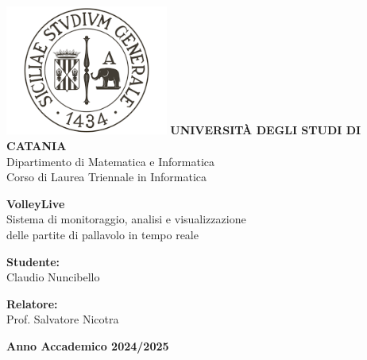 \documentclass[a4paper,12pt]{report}
\begin{document}
\begin{titlepage}
    \begin{center}
        \includegraphics[width=0.4\textwidth]{logo-universita.png}
        \Large\textbf{UNIVERSIT\`A DEGLI STUDI DI CATANIA}\\[0.3cm]
        \large Dipartimento di Matematica e Informatica\\
        \large Corso di Laurea Triennale in Informatica\\[2cm]

        \vspace{2cm}

        {\Huge \textbf{VolleyLive}}\\[0.5cm]
        {\large Sistema di monitoraggio, analisi e visualizzazione\\
        delle partite di pallavolo in tempo reale}\\[2.5cm]

        \vspace{1cm}

        \begin{flushleft}
            \textbf{Studente:} \\
            Claudio Nuncibello
        \end{flushleft}

        \vspace{1cm}

        \begin{flushright}
            \textbf{Relatore:} \\
            Prof. Salvatore Nicotra
        \end{flushright}

        \vfill

        \textbf{Anno Accademico 2024/2025}
    \end{center}
\end{titlepage}
\end{document}
